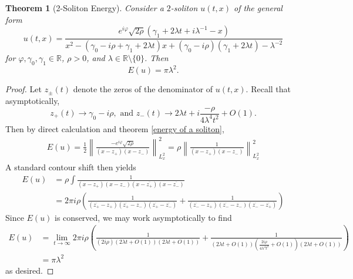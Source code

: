 \documentclass{amsart}
\newtheorem{theorem}{Theorem}[section]
\theoremstyle{definition}
\newcommand\R{\mathbb{R}}
\renewcommand{\(}{\left(}
\renewcommand{\)}{\right)}
\begin{document}
\begin{theorem}[2-Soliton Energy]
    Consider a $2$-soliton $u(t,x)$ of the general form
    \begin{equation*}
        u(t,x) = \frac{e^{i\varphi} \sqrt{2\rho}(\gamma_1 + 2 \lambda t + i \lambda^{-1} - x)}{x^2 - (\gamma_0 - i \rho + \gamma_1 + 2 \lambda t)x + (\gamma_0 - i \rho)(\gamma_1 + 2 \lambda t) - \lambda^{-2}}
    \end{equation*}
    for $\varphi,\gamma_0,\gamma_1 \in \R$, $\rho > 0$, and $\lambda \in \R\setminus\{0\}$. Then
    \begin{equation*}
        E(u) = \pi \lambda^2.
    \end{equation*}
\end{theorem}
\begin{proof}
    Let $z_\pm(t)$ denote the zeros of the denominator of $u(t,x)$. Recall that asymptotically,
    \begin{equation*}
        z_+(t) \to \gamma_0 - i \rho, \text{ and } z_-(t) \to 2\lambda t + i\frac{-\rho}{4\lambda^4 t^2} + O(1).
    \end{equation*}
    Then by direct calculation and theorem \ref{energy of a soliton},
    \begin{align*}
        E(u) = \frac{1}{2} \left\|\frac{-e^{i\varphi} \sqrt{2\rho}}{(x-z_+)(x-z_-)} \right\|_{L_x^2}^2 =  \rho \left\|\frac{1}{(x-z_+)(x-z_-)} \right\|_{L_x^2}^2
    \end{align*}
    A standard contour shift then yields
    \begin{align*}
        E(u) & = \rho \int\frac{1}{(x-z_+)(x-z_-)(x-\overline{z_+})(x-\overline{z_-})} \\
        & = 2\pi i \rho\(\frac{1}{(\overline{z_+}-z_+)(\overline{z_+}-z_-)(\overline{z_+}-\overline{z_-})} + \frac{1}{(\overline{z_-}-z_+)(\overline{z_-}-z_-)(\overline{z_-}-\overline{z_+})}\)
    \end{align*}
    Since $E(u)$ is conserved, we may work asymptotically to find
    \begin{align*}
        E(u) & = \lim_{t \to \infty} 2\pi i \rho\(\frac{1}{(2i\rho)(2\lambda t + O(1))(2\lambda t + O(1))} + \frac{1}{(2\lambda t + O(1))(\frac{2i\rho}{4\lambda^4t^2} + O(1))(2\lambda t + O(1))}\) \\
        & = \pi \lambda^2
    \end{align*}
    as desired.
\end{proof}
\end{document}
